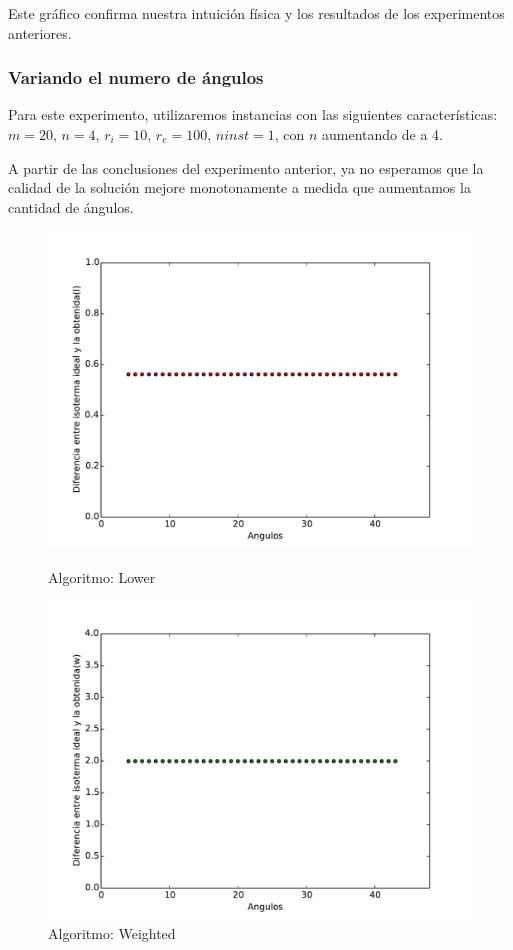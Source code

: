 Este gráfico confirma nuestra intuición física y los resultados de los experimentos anteriores.

\pagebreak

\subsubsection{Variando el numero de ángulos}

Para este experimento, utilizaremos instancias con las siguientes características: $m = 20$, $n = 4$, $r_i = 10$, $r_e = 100$, $ninst = 1$, con $n$ aumentando de a 4.

A partir de las conclusiones del experimento anterior, ya no esperamos que la calidad de la solución mejore monotonamente a medida que aumentamos la cantidad de ángulos.

\begin{figure}[h]
  \centering
  \begin{minipage}[b]{0.49\textwidth}
    \includegraphics[width=\textwidth]{graficos/nVariable_l.pdf}
    \caption{Algoritmo: Lower}
  \end{minipage}
  \hfill
  \begin{minipage}[b]{0.49\textwidth}
    \includegraphics[width=\textwidth]{graficos/nVariable_w.pdf}
    \caption{Algoritmo: Weighted}
  \end{minipage}
\end{figure}

